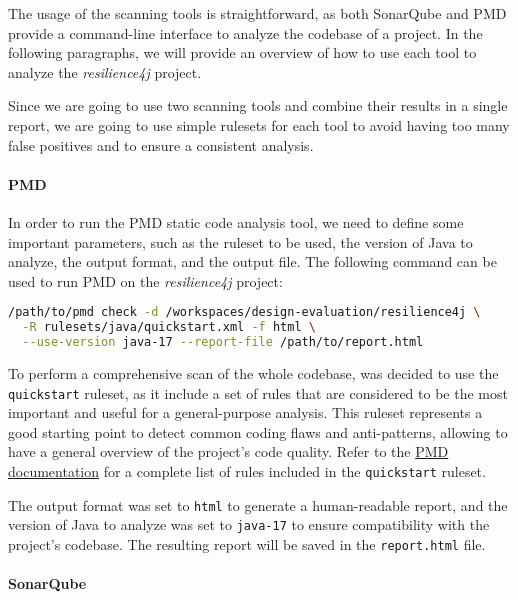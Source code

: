 The usage of the scanning tools is straightforward, as both SonarQube and PMD provide a command-line interface to analyze the codebase of a project. In the following paragraphs, we will provide an overview of how to use each tool to analyze the \textit{resilience4j} project.

Since we are going to use two scanning tools and combine their results in a single report, we are going to use simple rulesets for each tool to avoid having too many false positives and to ensure a consistent analysis.

\paragraph{PMD}

In order to run the PMD static code analysis tool, we need to define some important parameters, such as the ruleset to be used, the version of Java to analyze, the output format, and the output file. The following command can be used to run PMD on the \textit{resilience4j} project:

\begin{lstlisting}[language=bash, caption={Command to run PDM static code analysis}]
/path/to/pmd check -d /workspaces/design-evaluation/resilience4j \
  -R rulesets/java/quickstart.xml -f html \
  --use-version java-17 --report-file /path/to/report.html
\end{lstlisting}

\noindent To perform a comprehensive scan of the whole codebase, was decided to use the \texttt{quickstart} ruleset, as it include a set of rules that are considered to be the most important and useful for a general-purpose analysis. This ruleset represents a good starting point to detect common coding flaws and anti-patterns, allowing to have a general overview of the project's code quality. Refer to the \href{https://pmd.github.io/pmd/pmd_rules_java.html#additional-rulesets}{PMD documentation} for a complete list of rules included in the \texttt{quickstart} ruleset.

The output format was set to \texttt{html} to generate a human-readable report, and the version of Java to analyze was set to \texttt{java-17} to ensure compatibility with the project's codebase. The resulting report will be saved in the \texttt{report.html} file.

\paragraph{SonarQube}

